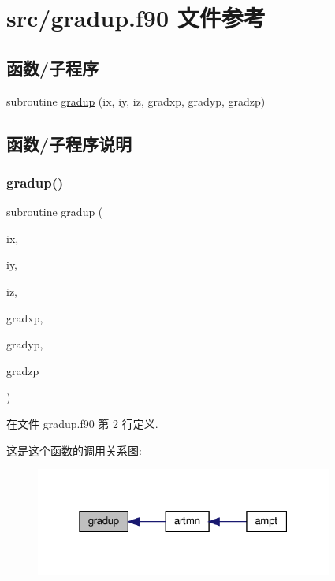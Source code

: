 \hypertarget{gradup_8f90}{}\section{src/gradup.f90 文件参考}
\label{gradup_8f90}
\subsection*{函数/子程序}
\begin{DoxyCompactItemize}
\item 
subroutine \mbox{\hyperlink{gradup_8f90_a574ed29fa8a1542aa0cf11c7359b0d45}{gradup}} (ix, iy, iz, gradxp, gradyp, gradzp)
\end{DoxyCompactItemize}


\subsection{函数/子程序说明}
\mbox{\label{gradup_8f90_a574ed29fa8a1542aa0cf11c7359b0d45}} 
\subsubsection{\texorpdfstring{gradup()}{gradup()}}
{\footnotesize\ttfamily subroutine gradup (\begin{DoxyParamCaption}\item[{}]{ix,  }\item[{}]{iy,  }\item[{}]{iz,  }\item[{}]{gradxp,  }\item[{}]{gradyp,  }\item[{}]{gradzp }\end{DoxyParamCaption})}



在文件 gradup.\+f90 第 2 行定义.

这是这个函数的调用关系图\+:
\nopagebreak
\begin{figure}[H]
\begin{center}
\leavevmode
\includegraphics[width=277pt]{gradup_8f90_a574ed29fa8a1542aa0cf11c7359b0d45_icgraph}
\end{center}
\end{figure}
